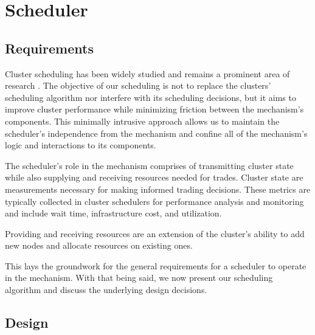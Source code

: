 \section{Scheduler}
\subsection{Requirements}

Cluster scheduling has been widely studied and remains a prominent area of
research \cite{hindman_mesos_nodate, zaharia_delay_2010, patel_what_2022,
li_lyra_2023, qiao_pollux_nodate, schwarzkopf_omega_2013,
karanasos_mercury_2015, delgado_hawk_2015}. The objective of our scheduling is
not to replace the clusters' scheduling algorithm nor interfere with its
scheduling decisions, but it aims to improve cluster performance while
minimizing friction between the mechanism's components. This minimally intrusive
approach allows us to maintain the scheduler's independence from the mechanism
and confine all of the mechanism's logic and interactions to its components.

The scheduler's role in the mechanism comprises of transmitting cluster state
while also supplying and receiving resources needed for trades. Cluster state are
measurements necessary for making informed trading decisions. These metrics are
typically collected in cluster schedulers for performance analysis and
monitoring and include wait time, infrastructure cost, and utilization.

\noindent Providing and receiving resources are an extension of the cluster's
ability to add new nodes and allocate resources on existing ones. 

This lays the groundwork for the general requirements for a scheduler to
operate in the mechanism. With that being said, we now present our scheduling
algorithm and discuss the underlying design decisions. 

\subsection{Design}

